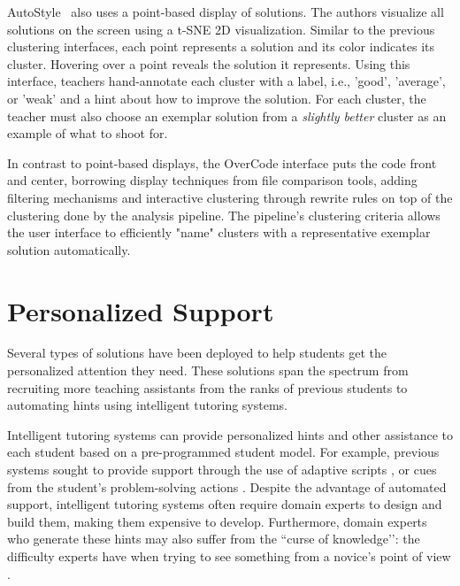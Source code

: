 AutoStyle~\cite{choudhury2016autostyle} also uses a point-based display of solutions. The authors visualize all solutions on the screen using a t-SNE 2D visualization. Similar to the previous clustering interfaces, each point represents a solution and its color indicates its cluster. Hovering over a point reveals the solution it represents. Using this interface, teachers hand-annotate each cluster with a label, i.e., 'good', 'average', or 'weak' and a hint about how to improve the solution. For each cluster, the teacher must also choose an exemplar solution from a {\it slightly better} cluster as an example of what to shoot for.

In contrast to point-based displays, the OverCode interface puts the code front and center, borrowing display techniques from file comparison tools, adding filtering mechanisms and interactive clustering through rewrite rules on top of the clustering done by the analysis pipeline. The pipeline's clustering criteria allows the user interface to efficiently "name" clusters with a representative exemplar solution automatically.


\section{Personalized Support}
Several types of solutions have been deployed to help students get the personalized attention they need. These solutions span the spectrum from recruiting more teaching assistants from the ranks of previous students \cite{communityTAs} to automating hints using intelligent tutoring systems. 

Intelligent tutoring systems can provide personalized hints and other assistance to each student based on a pre-programmed student model. For example, previous systems sought to provide support through the use of adaptive scripts \cite{kumar2007tutorial}, or cues from the student’s problem-solving actions \cite{diziol}. Despite the advantage of automated support, intelligent tutoring systems often require domain experts to design and build them, making them expensive to develop.  Furthermore, domain experts who generate these hints may also suffer from the ``curse of knowledge’’: the difficulty experts have when trying to see something from a novice’s point of view \cite{curse}. 


